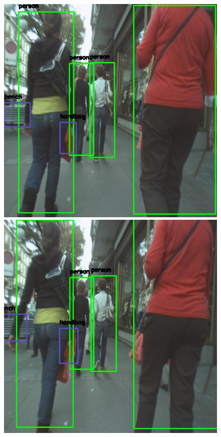 \begin{figure}[H]
\begin{center}
\includegraphics[scale=0.25]{figures/652.jpg}
\includegraphics[scale=0.25]{figures/655.jpg}

\end{center}
\end{figure}
